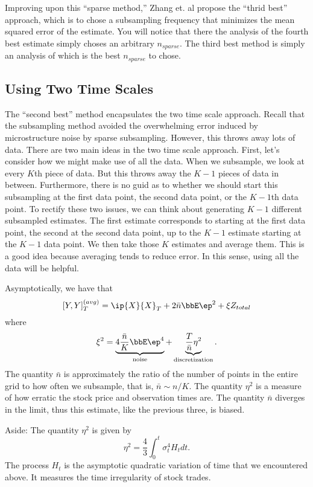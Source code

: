 \documentclass{report}
\begin{document}
Improving upon this ``sparse method,'' Zhang et. al propose the
``thrid best'' approach, which is to chose a subsampling frequency
that minimizes the mean squared error of the estimate.  You will notice that there the analysis of the fourth best estimate simply choses an arbitrary $n_{sparse}$.  The third best method is simply an analysis of which is the best $n_{sparse}$ to chose.

\subsection*{Using Two Time Scales}

The ``second best'' method encapsulates the two time scale approach.  Recall that the subsampling method avoided the overwhelming error induced by microstructure noise by sparse subsampling.  However, this throws away lots of data.  There are two main ideas in the two time scale approach.  First, let's consider how we might make use of all the data.  When we subsample, we look at every $K$th piece of data.  But this throws away the $K-1$ pieces of data in between.  Furthermore, there is no guid as to whether we should start this subsampling at the first data point, the second data point, or the $K-1$th data point.  To rectify these two issues, we can think about generating $K-1$ different subsampled estimates.  The first estimate corresponds to starting at the first data point, the second at the second data point, up to the $K-1$ estimate starting at the $K-1$ data point.  We then take those $K$ estimates and average them.  This is a good idea because averaging tends to reduce error.  In this sense, using all the data will be helpful.

Asymptotically, we have that
\[
[Y,Y]_T^{(avg)} = \ip{X}{X}_T + 2 \bar n \bbE \ep^2 + \xi Z_{total}
\]
where
\[
\xi^2 = \underbrace{4 \frac{\bar n}{K} \bbE \ep^4}_{\textmd{noise}} + \underbrace{\frac{T}{\bar n} \eta^2}_{\textmd{discretization}}.
\]
The quantity $\bar n$ is approximately the ratio of the number of points in the entire grid to how often we subsample, that is, $\bar n \sim n / K$.  The quantity $\eta^2$ is a measure of how erratic the stock price and observation times are.  The quantity $\bar n$ diverges in the limit, thus this estimate, like the previous three, is biased.

Aside: The quantity $\eta^2$ is given by
\[
\eta^2 = \frac{4}{3} \int_0^t \sigma_t^4 H_t dt.
\]
The process $H_t$ is the asymptotic quadratic variation of time that we encountered above.  It measures the time irregularity of stock trades.
\end{document}
